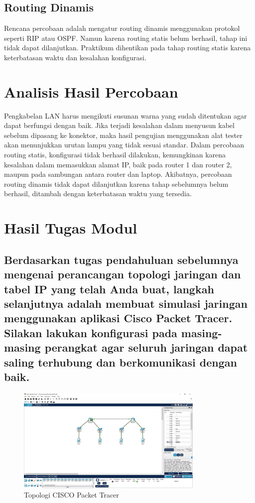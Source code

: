 \subsection{Routing Dinamis}
Rencana percobaan adalah mengatur routing dinamis menggunakan protokol seperti RIP atau OSPF. Namun karena routing statis belum berhasil, tahap ini tidak dapat dilanjutkan. Praktikum dihentikan pada tahap routing statis karena keterbatasan waktu dan kesalahan konfigurasi.

\section{Analisis Hasil Percobaan}
Pengkabelan LAN harus mengikuti susunan warna yang sudah ditentukan agar dapat berfungsi dengan baik. Jika terjadi kesalahan dalam menyusun kabel sebelum dipasang ke konektor, maka hasil pengujian menggunakan alat tester akan menunjukkan urutan lampu yang tidak sesuai standar. Dalam percobaan routing statis, konfigurasi tidak berhasil dilakukan, kemungkinan karena kesalahan dalam memasukkan alamat IP, baik pada router 1 dan router 2, maupun pada sambungan antara router dan laptop. Akibatnya, percobaan routing dinamis tidak dapat dilanjutkan karena tahap sebelumnya belum berhasil, ditambah dengan keterbatasan waktu yang tersedia.

\section{Hasil Tugas Modul}
\subsection{Berdasarkan tugas pendahuluan sebelumnya mengenai perancangan topologi jaringan dan tabel IP yang telah Anda buat, langkah selanjutnya adalah membuat simulasi jaringan menggunakan aplikasi Cisco Packet Tracer. Silakan lakukan konfigurasi pada masing-masing perangkat agar seluruh jaringan dapat saling terhubung dan berkomunikasi dengan baik.}
\begin{figure}[H]
    \centering
    \includegraphics[width=0.8\textwidth]{P1/img/Paket.png}
    \caption{Topologi CISCO Packet Tracer}
    \label{fig:labelgambar}
\end{figure}

